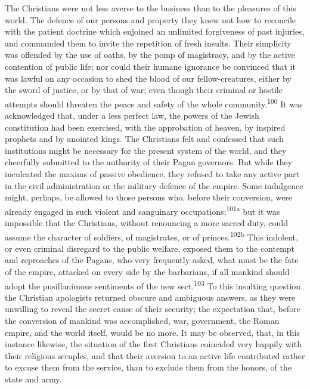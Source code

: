


The Christians were not less averse to the business than to the
pleasures of this world. The defence of our persons and property
they knew not how to reconcile with the patient doctrine which
enjoined an unlimited forgiveness of past injuries, and commanded
them to invite the repetition of fresh insults. Their simplicity
was offended by the use of oaths, by the pomp of magistracy, and
by the active contention of public life; nor could their humane
ignorance be convinced that it was lawful on any occasion to shed
the blood of our fellow-creatures, either by the sword of
justice, or by that of war; even though their criminal or hostile
attempts should threaten the peace and safety of the whole
community.\textsuperscript{100} It was acknowledged that, under a less perfect
law, the powers of the Jewish constitution had been exercised,
with the approbation of heaven, by inspired prophets and by
anointed kings. The Christians felt and confessed that such
institutions might be necessary for the present system of the
world, and they cheerfully submitted to the authority of their
Pagan governors. But while they inculcated the maxims of passive
obedience, they refused to take any active part in the civil
administration or the military defence of the empire. Some
indulgence might, perhaps, be allowed to those persons who,
before their conversion, were already engaged in such violent and
sanguinary occupations;\textsuperscript{101a} but it was impossible that the
Christians, without renouncing a more sacred duty, could assume
the character of soldiers, of magistrates, or of princes.\textsuperscript{102b}
This indolent, or even criminal disregard to the public welfare,
exposed them to the contempt and reproaches of the Pagans, who
very frequently asked, what must be the fate of the empire,
attacked on every side by the barbarians, if all mankind should
adopt the pusillanimous sentiments of the new sect.\textsuperscript{103} To this
insulting question the Christian apologists returned obscure and
ambiguous answers, as they were unwilling to reveal the secret
cause of their security; the expectation that, before the
conversion of mankind was accomplished, war, government, the
Roman empire, and the world itself, would be no more. It may be
observed, that, in this instance likewise, the situation of the
first Christians coincided very happily with their religious
scruples, and that their aversion to an active life contributed
rather to excuse them from the service, than to exclude them from
the honors, of the state and army.

